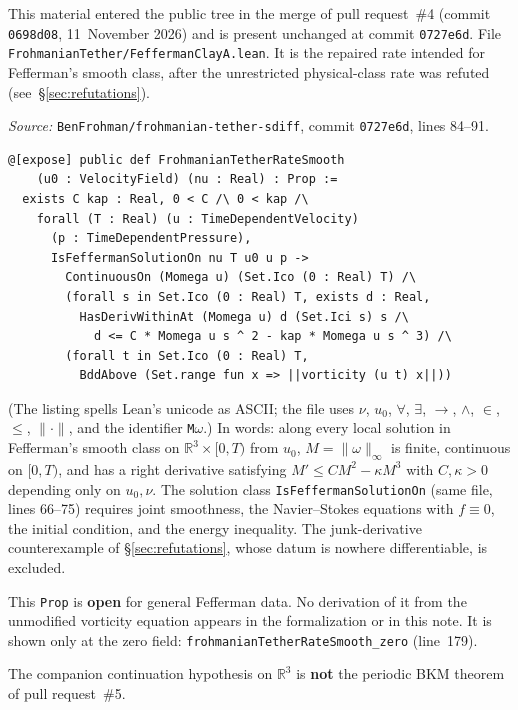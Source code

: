 \documentclass[11pt]{article}
\theoremstyle{plain}
\theoremstyle{definition}
\theoremstyle{remark}
\newcommand{\R}{\mathbb{R}}
\newcommand{\sdiffsha}{0727e6d}
\begin{document}
This material entered the public tree in the merge of pull request~\#4 (commit \texttt{0698d08}, 11~November 2026) and is present unchanged at commit \texttt{\sdiffsha}. File \texttt{FrohmanianTether/\hspace{0pt}FeffermanClayA.\hspace{0pt}lean}. It is the repaired rate intended for Fefferman's smooth class, after the unrestricted physical-class rate was refuted (see~\S\ref{sec:refutations}).

\textit{Source:} \texttt{BenFrohman/\hspace{0pt}frohmanian-tether-sdiff}, commit \texttt{\sdiffsha}, lines 84--91.
\begin{lstlisting}
@[expose] public def FrohmanianTetherRateSmooth
    (u0 : VelocityField) (nu : Real) : Prop :=
  exists C kap : Real, 0 < C /\ 0 < kap /\
    forall (T : Real) (u : TimeDependentVelocity)
      (p : TimeDependentPressure),
      IsFeffermanSolutionOn nu T u0 u p ->
        ContinuousOn (Momega u) (Set.Ico (0 : Real) T) /\
        (forall s in Set.Ico (0 : Real) T, exists d : Real,
          HasDerivWithinAt (Momega u) d (Set.Ici s) s /\
            d <= C * Momega u s ^ 2 - kap * Momega u s ^ 3) /\
        (forall t in Set.Ico (0 : Real) T,
          BddAbove (Set.range fun x => ||vorticity (u t) x||))
\end{lstlisting}
(The listing spells Lean's unicode as ASCII; the file uses \(\nu\), \(u_{0}\), \(\forall\), \(\exists\), \(\to\), \(\wedge\), \(\in\), \(\le\), \(\|\cdot\|\), and the identifier \texttt{M\(\omega\)}.) In words: along every local solution in Fefferman's smooth class on \(\R^{3}\times[0,T)\) from \(u_{0}\), \(M=\|\omega\|_{\infty}\) is finite, continuous on \([0,T)\), and has a right derivative satisfying \(M'\le C M^{2}-\kappa M^{3}\) with \(C,\kappa>0\) depending only on \(u_{0},\nu\). The solution class \texttt{IsFeffermanSolutionOn} (same file, lines 66--75) requires joint smoothness, the Navier--Stokes equations with \(f\equiv 0\), the initial condition, and the energy inequality. The junk-derivative counterexample of \S\ref{sec:refutations}, whose datum is nowhere differentiable, is excluded.

This \texttt{Prop} is \textbf{open} for general Fefferman data. No derivation of it from the unmodified vorticity equation appears in the formalization or in this note. It is shown only at the zero field: \texttt{frohmanianTetherRateSmooth\_\hspace{0pt}zero} (line~179).

The companion continuation hypothesis on \(\R^{3}\) is \textbf{not} the periodic BKM theorem of pull request~\#5.
\end{document}
